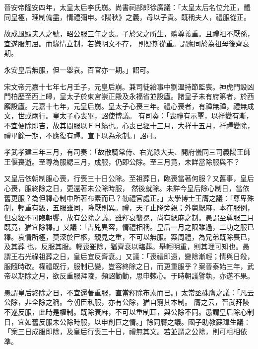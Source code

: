 \begin{pinyinscope}
 晉安帝隆安四年，太皇太后李氏崩。尚書祠部郎徐廣議：「太皇太后名位允正，體同皇極，理制備盡，情禮彌申。《陽秋》之義，母以子貴。既稱夫人，禮服從正。



 故成風顯夫人之號，昭公服三年之喪。子於父之所生，體尊義重。且禮祖不厭孫，宜遂服無屈。而緣情立制，若嫌明文不存，
 則疑斯從重。謂應同於為祖母後齊衰期。



 永安皇后無服，但一舉哀。百官亦一期。」詔可。



 宋文帝元嘉十七年七月壬子，元皇后崩。兼司徒給事中劉溫持節監喪。神虎門設凶門柏歷至西上皞，皇太子於東宮崇正殿及永福省並設廬。諸皇子未有府第者，於西廨設廬。元嘉十七年，元皇后崩。皇太子心喪三年。禮心喪者，有禫無禫，禮無成文，世或兩行。皇太子心喪畢，詔使博議。
 有司奏：「喪禮有示覃，以祥變有漸，不宜便除即吉，故其間服以ＦＨ縞也。心喪已經十三月，大祥十五月，祥禫變除，禮畢餘一期，不應復有禫。宣下以為永制。」詔可。



 孝武孝建三年三月，有司奏：「故散騎常侍、右光祿大夫、開府儀同三司義陽王師王偃喪逝。至尊為服緦三月，成服，仍即公除。至三月竟，未詳當除服與不？



 又皇后依朝制服心喪，行喪三十日公除。至祖葬日，臨喪當著何服？又舊事，皇后心喪，服終除之日，更還著未公除時服，
 然後就除。未詳今皇后除心制日，當依舊更服？為但釋心制中所著布素而已？勒禮官處正。」太學博士王膺之議：「尊卑殊制，輕重有級，五服雖同，降厭則異。禮，天子止降旁親；外舅緦麻，本在服例，但衰絰不可臨朝饗，故有公除之議。雖釋衰襲冕，尚有緦麻之制。愚謂至尊服三月既竟，猶宜除釋。」又議：「吉兇異容，情禮相稱。皇后一月之限雖過，二功之服已釋。哀情所極，莫深於尸柩，親見之重，不可以無服。案周禮，為兄弟既除喪已，及其葬
 也，反服其服。輕喪雖除，猶齊衰以臨葬。舉輕明重，則其理可知也。愚謂王右光祿祖葬之日，皇后宜反齊衰。」又議：「喪禮即遠，變除漸輕；情與日殺，服隨時改。權禮既行，服制已變，豈容終除之日，而更重服乎？案晉泰始三年，武帝以期除之月，欲反重服拜陵，頻詔勤勤，思申棘心。于時朝議譬執，亦遂不果。



 愚謂皇后終除之日，不宜還著重服，直當釋除布素而已。」太常丞硃膺之議：「凡云公除，非全除之稱。今朝臣私服，亦有公除，猶自窮其本制。
 膺之云，晉武拜陵不遂反服，此時是權制。既除衰麻，不可以重制耳，與公除不同。愚謂皇后除心制日，宜如舊反服未公除時服，以申創巨之情。」餘同膺之議。國子助教蘇瑋生議：「案三日成服即除，及皇后行喪三十日，禮無其文。若並謂之公除，則可粗相依準。




\end{pinyinscope}
